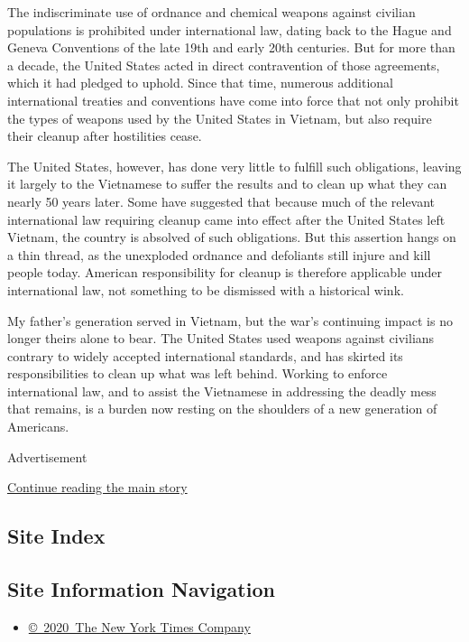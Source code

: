 The indiscriminate use of ordnance and chemical weapons against civilian
populations is prohibited under international law, dating back to the
Hague and Geneva Conventions of the late 19th and early 20th centuries.
But for more than a decade, the United States acted in direct
contravention of those agreements, which it had pledged to uphold. Since
that time, numerous additional international treaties and conventions
have come into force that not only prohibit the types of weapons used by
the United States in Vietnam, but also require their cleanup after
hostilities cease.

The United States, however, has done very little to fulfill such
obligations, leaving it largely to the Vietnamese to suffer the results
and to clean up what they can nearly 50 years later. Some have suggested
that because much of the relevant international law requiring cleanup
came into effect after the United States left Vietnam, the country is
absolved of such obligations. But this assertion hangs on a thin thread,
as the unexploded ordnance and defoliants still injure and kill people
today. American responsibility for cleanup is therefore applicable under
international law, not something to be dismissed with a historical wink.

My father's generation served in Vietnam, but the war's continuing
impact is no longer theirs alone to bear. The United States used weapons
against civilians contrary to widely accepted international standards,
and has skirted its responsibilities to clean up what was left behind.
Working to enforce international law, and to assist the Vietnamese in
addressing the deadly mess that remains, is a burden now resting on the
shoulders of a new generation of Americans.

Advertisement

\protect\hyperlink{after-bottom}{Continue reading the main story}

\hypertarget{site-index}{%
\subsection{Site Index}\label{site-index}}

\hypertarget{site-information-navigation}{%
\subsection{Site Information
Navigation}\label{site-information-navigation}}

\begin{itemize}
\tightlist
\item
  \href{https://help.nytimes3xbfgragh.onion/hc/en-us/articles/115014792127-Copyright-notice}{©~2020~The
  New York Times Company}
\end{itemize}

